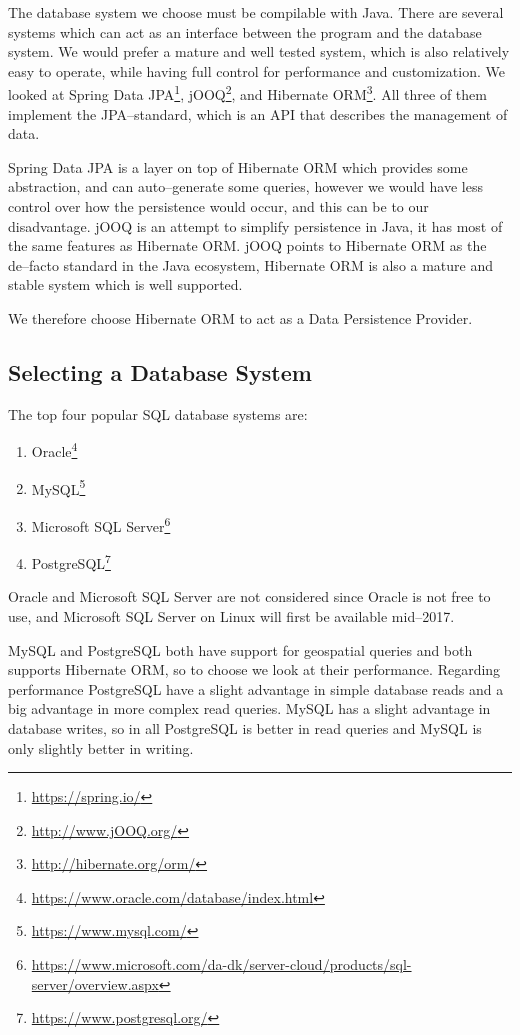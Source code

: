 The database system we choose must be compilable with Java.
There are several systems which can act as an interface between the program and the database system.
We would prefer a mature and well tested system, which is also relatively easy to operate, while having full control for performance and customization.
We looked at Spring Data JPA\footnote{\url{https://spring.io/}}, jOOQ\footnote{\url{http://www.jOOQ.org/}}, and Hibernate ORM\footnote{\url{http://hibernate.org/orm/}}.
All three of them implement the \ac{JPA}--standard\cite{JavaPersistenceAPI}, which is an \ac{API} that describes the management of data. 

Spring Data JPA is a layer on top of Hibernate ORM which provides some abstraction, and can auto--generate some queries, however we would have less control over how the persistence would occur, and this can be to our disadvantage.
jOOQ is an attempt to simplify persistence in Java, it has most of the same features as Hibernate ORM.
jOOQ points to Hibernate ORM as the de--facto standard in the Java ecosystem\cite{JOOQvsHIBERNATE},
Hibernate ORM is also a mature and stable system which is well supported. 

We therefore choose Hibernate ORM to act as a Data Persistence Provider. 

\subsection{Selecting a Database System}

The top four popular SQL database systems are\cite{DB_RANKINGS}: 
\begin{enumerate}
\item Oracle\footnote{\url{https://www.oracle.com/database/index.html}}
\item MySQL\footnote{\url{https://www.mysql.com/}}
\item Microsoft SQL Server\footnote{\url{https://www.microsoft.com/da-dk/server-cloud/products/sql-server/overview.aspx}}
\item PostgreSQL\footnote{\url{https://www.postgresql.org/}}
\end{enumerate}

Oracle and Microsoft SQL Server are not considered since Oracle is not free to use\cite{oracle_pricing}, 
and Microsoft SQL Server on Linux will first be available mid--2017\cite{ms_sql_linux}.

MySQL and PostgreSQL both have support for geospatial queries and both supports Hibernate ORM\cite{hibernate_support}, so to choose we look at their performance.
Regarding performance PostgreSQL have a slight advantage in simple database reads and a big advantage in more complex read queries.
MySQL has a slight advantage in database writes, 
so in all PostgreSQL is better in read queries and MySQL is only slightly better in writing.\cite{post_vs_mysql}

